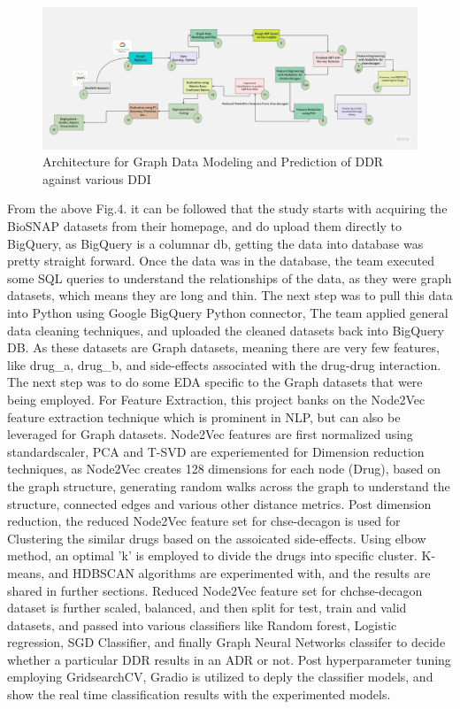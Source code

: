 \documentclass[journal,transmag]{J-NaNA}
\begin{document}
\begin{figure}[htbp]
\centering
\includegraphics[width=\linewidth]{primary_architecture.jpg} 
\caption{Architecture for Graph Data Modeling and Prediction of DDR against various DDI}
\label{fig:primary_architecture} %
\end{figure}

From the above Fig.4. it can be followed that the study starts with acquiring the BioSNAP datasets from their homepage, and do upload them directly to BigQuery, as BigQuery is a columnar db, getting the data into database was pretty straight forward. Once the data was in the database, the team executed some SQL queries to understand the relationships of the data, as they were graph datasets, which means they are long and thin. The next step was to pull this data into Python using Google BigQuery Python connector, The team applied general data cleaning techniques, and uploaded the cleaned datasets back into BigQuery DB. As these datasets are Graph datasets, meaning there are very few features, like drug\_a, drug\_b, and side-effects associated with the drug-drug interaction. The next step was to do some EDA specific to the Graph datasets that were being employed. For Feature Extraction, this project banks on the Node2Vec feature extraction technique which is prominent in NLP, but can also be leveraged for Graph datasets. Node2Vec features are first normalized using standardscaler, PCA and T-SVD are experiemented for Dimension reduction techniques, as Node2Vec creates 128 dimensions for each node (Drug), based on the graph structure, generating random walks across the graph to understand the structure, connected edges and various other distance metrics. Post dimension reduction, the reduced Node2Vec feature set for chse-decagon is used for Clustering the similar drugs based on the assoicated side-effects. Using elbow method, an optimal 'k' is employed to divide the drugs into specific cluster. K-means, and HDBSCAN algorithms are experimented with, and the results are shared in further sections. Reduced Node2Vec feature set for chchse-decagon dataset is further scaled, balanced, and then split for test, train and valid datasets, and passed into various classifiers like Random forest, Logistic regression, SGD Classifier, and finally Graph Neural Networks classifer to decide whether a particular DDR results in an ADR or not. Post hyperparameter tuning employing GridsearchCV, Gradio is utilized to deply the classifier models, and show the real time classification results with the experimented models.
\end{document}
